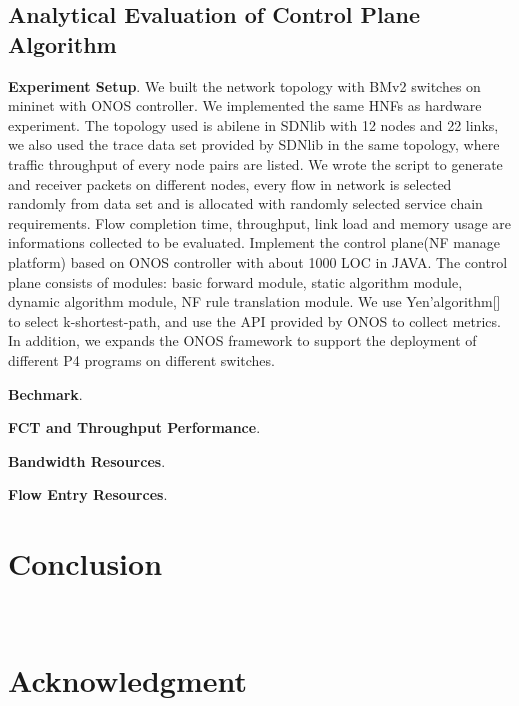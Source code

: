 \documentclass[10pt, conference, letterpaper]{IEEEtran}
\begin{document}
\subsection{Analytical Evaluation of Control Plane Algorithm}
\textbf{Experiment Setup}. We built the network topology with BMv2 switches on mininet with ONOS controller. We implemented the same HNFs as hardware experiment. The topology used is abilene in SDNlib with 12 nodes and 22 links, we also used the trace data set provided by SDNlib in the same topology, where traffic throughput of every node pairs are listed. We wrote the script to generate and receiver packets on different nodes, every flow in network is selected randomly from data set and is allocated with randomly selected service chain requirements. Flow completion time, throughput, link load and memory usage are informations collected to be evaluated. Implement the control plane(NF manage platform) based on ONOS controller with about 1000 LOC in JAVA. The control plane consists of modules: basic forward module, static algorithm module, dynamic algorithm module, NF rule translation module. We use Yen'algorithm[] to select k-shortest-path, and use the API provided by ONOS to collect metrics. In addition, we expands the ONOS framework to support the deployment of different P4 programs on different switches.

\textbf{Bechmark}.

\textbf{FCT and Throughput Performance}.

\textbf{Bandwidth Resources}.

\textbf{Flow Entry Resources}.


\section{Conclusion}
~\\


\section*{Acknowledgment}


  

\cite{Bianchi2014}
\cite{Sun2017}
\cite{Li2016}
\cite{Pontarelli2019}
\cite{Dargahi2017}
\cite{Gember-Jacobson2015}
\cite{Sun2017}
\cite{sun2017hyper}
\cite{bosshart2014p4}
\cite{fujisawa2002sdpa}
\cite{sun2017hyper}
\cite{xu2016demystifying}
\cite{bifulco2018survey}
\cite{zheng2018p4visor}
\cite{zhang2019hypervdp}
\cite{hancock2016hyper4}
\end{document}
